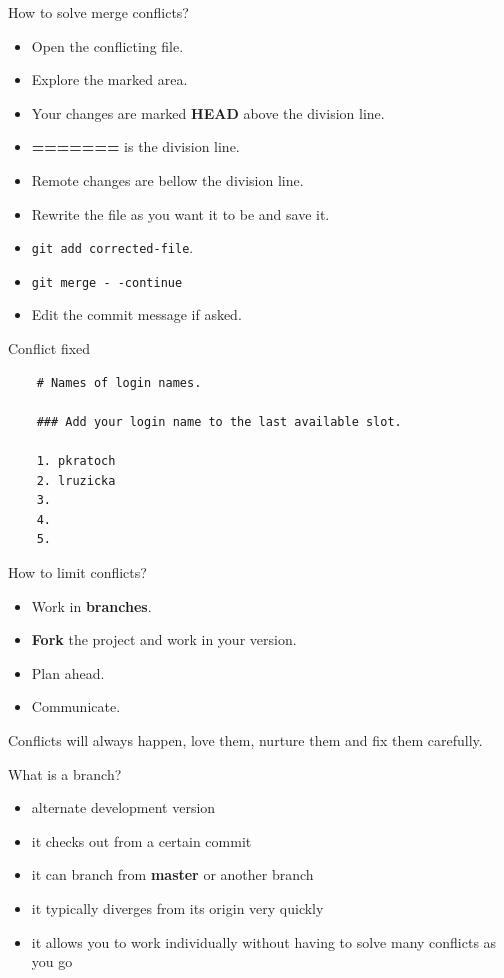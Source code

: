 \documentclass[14pt]{beamer}
\begin{document}
\begin{frame}{How to solve merge conflicts?}
	\begin{itemize}
		\item Open the conflicting file.
		\item Explore the marked area.
		\item Your changes are marked \textbf{HEAD} above the division line.
		\item \textbf{=======} is the division line.
		\item Remote changes are bellow the division line.
		\item Rewrite the file as you want it to be and save it.
		\item \texttt{git add corrected-file}.
		\item \texttt{git merge -\,-continue}
		\item Edit the commit message if asked.
	\end{itemize}
\end{frame}

	\begin{frame}[fragile]{Conflict fixed}
	\begin{verbatim}
	# Names of login names.
	
	### Add your login name to the last available slot.
	
	1. pkratoch
	2. lruzicka
	3.
	4.
	5.
	\end{verbatim}
	\end{frame}


	\begin{frame}{How to limit conflicts?}
	\begin{itemize}
		\item Work in \textbf{branches}.
		\item \textbf{Fork} the project and work in your version.
		\item Plan ahead.
		\item Communicate.
	\end{itemize}

	\vspace{5pt}

	Conflicts will always happen, love them, nurture them and fix them carefully.
\end{frame}

	\begin{frame}{What is a branch?}
	\begin{itemize}
		\item alternate development version
		\item it checks out from a certain commit
		\item it can branch from \textbf{master} or another branch
		\item it typically diverges from its origin very quickly
		\item it allows you to work individually without having to solve many conflicts as you go
	\end{itemize}
\end{frame}
\end{document}
